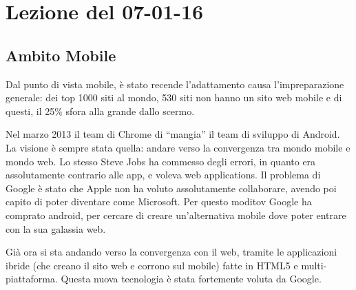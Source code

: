 \section{Lezione del 07-01-16}

\subsection{Ambito Mobile}

Dal punto di vista mobile, \`e stato recende l'adattamento causa l'impreparazione generale: dei top 1000 siti al mondo, 530 siti non hanno un sito web mobile e di questi, il 25\% sfora alla grande dallo scermo.

Nel marzo 2013 il team di Chrome di ``mangia'' il team di sviluppo di Android. La visione \`e sempre stata quella: andare verso la convergenza tra mondo mobile e mondo web. Lo stesso Steve Jobs ha commesso degli errori, in quanto era assolutamente contrario alle app, e voleva web applications. Il problema di Google \`e stato che Apple non ha voluto assolutamente collaborare, avendo poi capito di poter diventare come Microsoft. Per questo moditov Google ha comprato android, per cercare di creare un'alternativa mobile dove poter entrare con la sua galassia web.

Gi\`a ora si sta andando verso la convergenza con il web, tramite le applicazioni ibride (che creano il sito web e corrono sul mobile) fatte in HTML5 e multi-piattaforma. Questa nuova tecnologia \`e stata fortemente voluta da Google.

